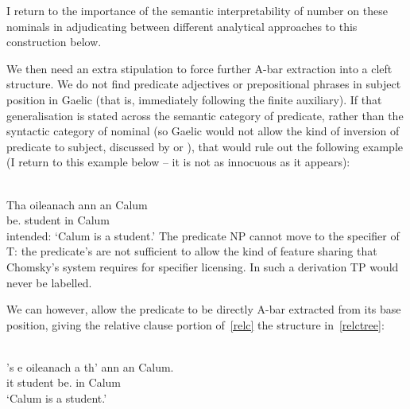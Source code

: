 \documentclass[output=paper]{langsci/langscibook}
\begin{document}
I return to the importance of the semantic interpretability of number on these
nominals in adjudicating between different analytical approaches to this
construction below.

We then need an extra stipulation to force further A-bar extraction into a
cleft structure.  We do not find predicate adjectives or prepositional phrases
in subject position in Gaelic (that is, immediately following the finite
auxiliary). If that generalisation is stated across the semantic category of
predicate, rather than the syntactic category of nominal (so Gaelic would not
allow the kind of inversion of predicate to subject, discussed by
\citet{moro:97} or \citet{dendikken:06}), that would rule out the following
example (I return to this example below -- it is not as innocuous as it
appears):

\ea {}\\
\gll * Tha oileanach {ann an} Calum\\
     {} be.\Prs{} student in Calum\\
\glt {} intended: `Calum is a student.'\label{oileanach-ann}
\z
The predicate NP cannot move to the specifier of T: the predicate's
 are not sufficient to allow the kind of feature sharing that
Chomsky's system requires for specifier licensing. In such a derivation TP
would never be labelled.

We can however, allow the predicate to be directly A-bar extracted from its
base position, giving the relative clause portion of~\eqref{relc} the structure
in~\eqref{relctree}:

\ea {} \label{relc}\\
\gll 's e oileanach a th' {ann an} Calum.\\
\Cop{} it student \Rel{} be.\Prs{} in Calum\\
\glt \enquote*{Calum is a student.}
\ex  \label{relctree}
\z
\end{document}
